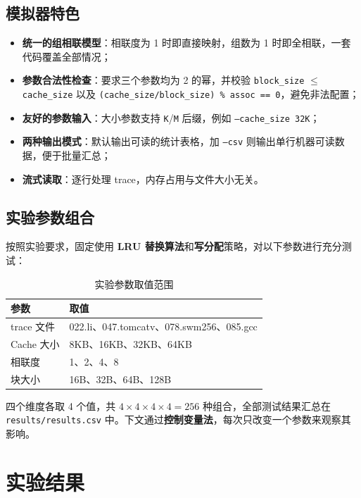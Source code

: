 \documentclass[12pt,a4paper]{ctexart}
\begin{document}
\subsection{模拟器特色}
\begin{itemize}
  \item \textbf{统一的组相联模型}：相联度为 1 时即直接映射，组数为 1 时即全相联，一套代码覆盖全部情况；
  \item \textbf{参数合法性检查}：要求三个参数均为 2 的幂，并校验 \texttt{block\_size} $\le$
        \texttt{cache\_size} 以及 \texttt{(cache\_size/block\_size) \% assoc == 0}，避免非法配置；
  \item \textbf{友好的参数输入}：大小参数支持 \texttt{K}/\texttt{M} 后缀，例如 \texttt{--cache\_size 32K}；
  \item \textbf{两种输出模式}：默认输出可读的统计表格，加 \texttt{--csv} 则输出单行机器可读数据，便于批量汇总；
  \item \textbf{流式读取}：逐行处理 trace，内存占用与文件大小无关。
\end{itemize}

\subsection{实验参数组合}
按照实验要求，固定使用 \textbf{LRU 替换算法}和\textbf{写分配}策略，对以下参数进行充分测试：
\begin{table}[H]
\centering
\caption{实验参数取值范围}
\label{tab:params}
\begin{tabular}{ll}
\toprule
参数 & 取值 \\
\midrule
trace 文件 & 022.li、047.tomcatv、078.swm256、085.gcc \\
Cache 大小 & 8KB、16KB、32KB、64KB \\
相联度 & 1、2、4、8 \\
块大小 & 16B、32B、64B、128B \\
\bottomrule
\end{tabular}
\end{table}
四个维度各取 4 个值，共 $4\times4\times4\times4 = 256$ 种组合，全部测试结果汇总在
\texttt{results/results.csv} 中。下文通过\textbf{控制变量法}，每次只改变一个参数来观察其影响。

\section{实验结果}
\end{document}

